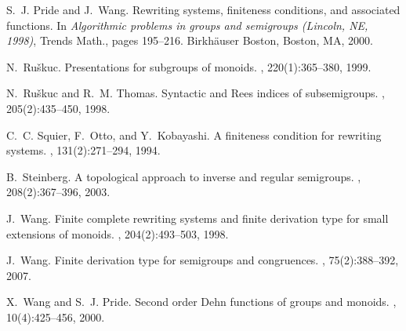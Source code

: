 \documentclass[11pt]{amsart}
\theoremstyle{plain}
\begin{document}
\begin{thebibliography}{10}
S.~J. Pride and J.~Wang.
\newblock Rewriting systems, finiteness conditions, and associated functions.
\newblock In {\em Algorithmic problems in groups and semigroups ({L}incoln,
  {NE}, 1998)}, Trends Math., pages 195--216. Birkh\"auser Boston, Boston, MA,
  2000.

N.~Ru{\v{s}}kuc.
\newblock Presentations for subgroups of monoids.
, 220(1):365--380, 1999.

N.~Ru{\v{s}}kuc and R.~M. Thomas.
\newblock Syntactic and {R}ees indices of subsemigroups.
, 205(2):435--450, 1998.

C.~C. Squier, F.~Otto, and Y.~Kobayashi.
\newblock A finiteness condition for rewriting systems.
, 131(2):271--294, 1994.

B.~Steinberg.
\newblock A topological approach to inverse and regular semigroups.
, 208(2):367--396, 2003.

J.~Wang.
\newblock Finite complete rewriting systems and finite derivation type for
  small extensions of monoids.
, 204(2):493--503, 1998.

J.~Wang.
\newblock Finite derivation type for semigroups and congruences.
, 75(2):388--392, 2007.

X.~Wang and S.~J. Pride.
\newblock Second order {D}ehn functions of groups and monoids.
, 10(4):425--456, 2000.

\end{thebibliography}
\end{document}
